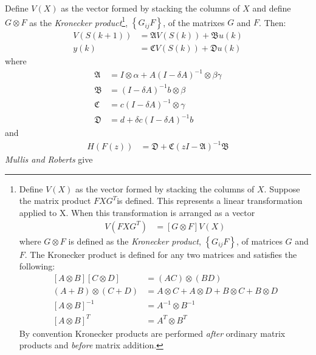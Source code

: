 \documentclass[a4paper,twoside,10pt,english]{report}
\begin{document}
Define $V\left(X\right)$ as the vector formed by stacking the columns
of $X$ and define $G\otimes F$ as the \emph{Kronecker product}\footnote{
Define $V\left(X\right)$ as the vector formed by stacking the columns
of $X$. Suppose the matrix product $FXG^{T}$is defined. This represents
a linear transformation applied to X. When this transformation is
arranged as a vector
\begin{align*}
V\left(FXG^{T}\right) &= \left[G\otimes F\right]V\left(X\right)
\end{align*}
where $G\otimes F$ is defined as the \emph{Kronecker product}, 
$\left\{ G_{ij}F\right\} $, of matrices $G$ and $F$. 
The Kronecker product is defined for any two matrices and satisfies the 
following:
\begin{align*}
\left[A\otimes B\right]\left[C\otimes D\right] &= \left(AC\right)\otimes\left(BD\right)\\
\left(A+B\right)\otimes\left(C+D\right) &= A\otimes C+A\otimes D+B\otimes C+B\otimes D\\
\left[A\otimes B\right]^{-1} &= A^{-1}\otimes B^{-1}\\
\left[A\otimes B\right]^{T} &= A^{T}\otimes B^{T}
\end{align*}
By convention Kronecker products are performed \emph{after} ordinary
matrix products and \emph{before} matrix addition.}, 
\emph{$\left\{ G_{ij}F\right\}$}, of the matrixes $G$ and $F$. Then:
\begin{align*}
V\left(S\left(k+1\right)\right) &= \mathfrak{A}V\left(S\left(k\right)\right)+\mathfrak{B}u\left(k\right)\\
y\left(k\right) &= \mathfrak{C}V\left(S\left(k\right)\right)+\mathfrak{D}u\left(k\right)
\end{align*}
where 
\begin{align*}
\mathfrak{A} &= I\otimes\alpha+A\left(I-\delta A\right)^{-1}\otimes\beta\gamma\\
\mathfrak{B} &= \left(I-\delta A\right)^{-1}b\otimes\beta\\
\mathfrak{C} &= c\left(I-\delta A\right)^{-1}\otimes\gamma\\
\mathfrak{D} &= d+\delta c\left(I-\delta A\right)^{-1}b
\end{align*}
 and 
\begin{align}
H\left(F\left(z\right)\right) &= \mathfrak{D}+\mathfrak{C}\left(zI-\mathfrak{A}\right)^{-1}\mathfrak{B}\label{eq:FreqTransHofF}
\end{align}
\emph{Mullis and Roberts} 
\cite{MullisRoberts_RoundoffNoiseInDigitalFiltersFrequencyTransformations} give
\end{document}
